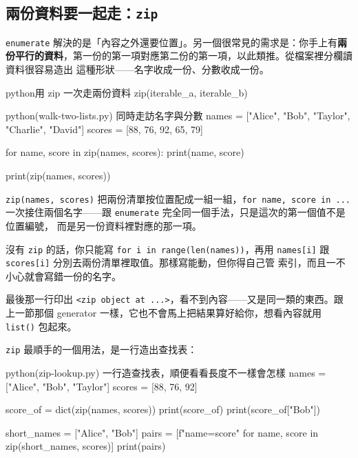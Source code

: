 \subsection*{兩份資料要一起走：\texttt{zip}}

\texttt{enumerate} 解決的是「內容之外還要位置」。另一個很常見的需求是：你手上有\textbf{兩
份平行的資料}，第一份的第一項對應第二份的第一項，以此類推。從檔案裡分欄讀資料很容易造出
這種形狀——名字收成一份、分數收成一份。

\begin{code}{python}{用 zip 一次走兩份資料}
zip(iterable_a, iterable_b)
\end{code}

\begin{example}{python}{(walk-two-lists.py) 同時走訪名字與分數}
names = ["Alice", "Bob", "Taylor", "Charlie", "David"]
scores = [88, 76, 92, 65, 79]

for name, score in zip(names, scores):
    print(name, score)

print(zip(names, scores))
\end{example}


\texttt{zip(names, scores)} 把兩份清單按位置配成一組一組，\texttt{for name, score in ...}
一次接住兩個名字——跟 \texttt{enumerate} 完全同一個手法，只是這次的第一個值不是位置編號，
而是另一份資料裡對應的那一項。

沒有 \texttt{zip} 的話，你只能寫 \texttt{for i in range(len(names))}，再用
\texttt{names[i]} 跟 \texttt{scores[i]} 分別去兩份清單裡取值。那樣寫能動，但你得自己管
索引，而且一不小心就會寫錯一份的名字。

最後那一行印出 \texttt{<zip object at ...>}，看不到內容——又是同一類的東西。跟上一節那個
generator 一樣，它也不會馬上把結果算好給你，想看內容就用 \texttt{list()} 包起來。

\texttt{zip} 最順手的一個用法，是一行造出查找表：

\begin{example}{python}{(zip-lookup.py) 一行造查找表，順便看看長度不一樣會怎樣}
names = ["Alice", "Bob", "Taylor"]
scores = [88, 76, 92]

score_of = dict(zip(names, scores))
print(score_of)
print(score_of["Bob"])

short_names = ["Alice", "Bob"]
pairs = [f"{name}={score}" for name, score in zip(short_names, scores)]
print(pairs)
\end{example}

